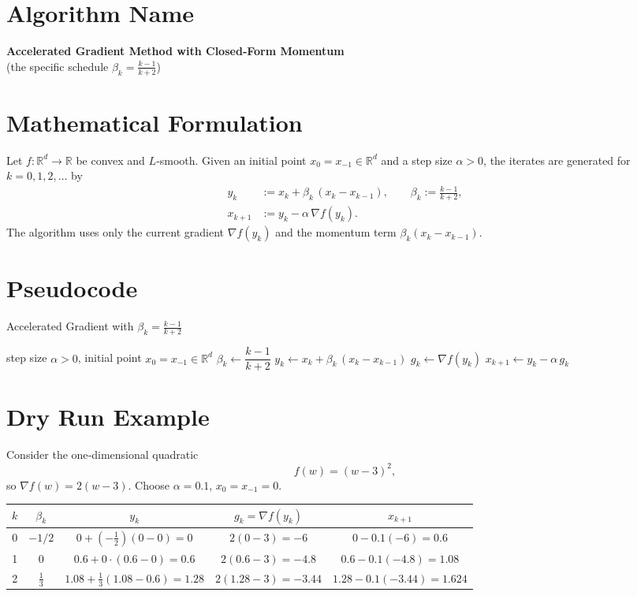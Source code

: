 \documentclass{article}
\newcommand{\R}{\mathbb{R}}
\newcommand{\grad}{\nabla}
\begin{document}
\section*{Algorithm Name}
\textbf{Accelerated Gradient Method with Closed‑Form Momentum}\\
(the specific schedule $\displaystyle \beta_k=\frac{k-1}{k+2}$)

\section*{Mathematical Formulation}
Let $f:\R^d\rightarrow\R$ be convex and $L$‑smooth.  
Given an initial point $x_{0}=x_{-1}\in\R^d$ and a step size $\alpha>0$, the iterates are generated for $k=0,1,2,\dots$ by
\begin{align}
    y_k &:= x_k+\beta_k\,(x_k-x_{k-1}),\qquad 
    \beta_k:=\frac{k-1}{k+2}, \label{eq:y}\\[4pt]
    x_{k+1} &:= y_k-\alpha\,\grad f(y_k). \label{eq:x}
\end{align}
The algorithm uses only the current gradient $\grad f(y_k)$ and the momentum term $\beta_k(x_k-x_{k-1})$.

\section*{Pseudocode}
\begin{algorithm}[H]
\caption{Accelerated Gradient with $\beta_k=\frac{k-1}{k+2}$}
\begin{algorithmic}[1]
\Require step size $\alpha>0$, initial point $x_{0}=x_{-1}\in\R^d$
    \State $\beta_k\gets \dfrac{k-1}{k+2}$ 
    \State $y_k \gets x_k + \beta_k\,(x_k-x_{k-1})$ 
    \State $g_k \gets \grad f(y_k)$
    \State $x_{k+1} \gets y_k - \alpha\, g_k$ 
\EndFor
\end{algorithmic}
\end{algorithm}

\section*{Dry Run Example}
Consider the one‑dimensional quadratic
\[
f(w)=(w-3)^2,
\]
so $\grad f(w)=2(w-3)$.  
Choose $\alpha=0.1$, $x_{0}=x_{-1}=0$.

\begin{center}
\begin{tabular}{c|c|c|c|c}
$k$ & $\beta_k$ & $y_k$ & $g_k=\grad f(y_k)$ & $x_{k+1}$ \\ \hline
0 & $-1/2$ & $0+(-\tfrac12)(0-0)=0$ & $2(0-3)=-6$ & $0-0.1(-6)=0.6$ \\[4pt]
1 & $0$   & $0.6+0\cdot(0.6-0)=0.6$ & $2(0.6-3)=-4.8$ & $0.6-0.1(-4.8)=1.08$ \\[4pt]
2 & $\tfrac13$ & $1.08+\tfrac13(1.08-0.6)=1.28$ & $2(1.28-3)=-3.44$ & $1.28-0.1(-3.44)=1.624$ 
\end{tabular}
\end{center}
\end{document}
